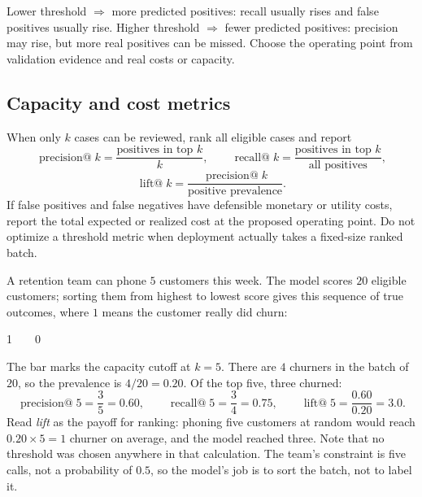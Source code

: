 \begin{keyidea}
Lower threshold $\Rightarrow$ more predicted positives: recall usually rises and false positives usually rise. Higher threshold $\Rightarrow$ fewer predicted positives: precision may rise, but more real positives can be missed. Choose the operating point from validation evidence and real costs or capacity.
\end{keyidea}

\subsection{Capacity and cost metrics}
\label{sec:capacity-metrics}

When only $k$ cases can be reviewed, rank all eligible cases and report
\[
\operatorname{precision@}k=\frac{\text{positives in top }k}{k},
\qquad
\operatorname{recall@}k=\frac{\text{positives in top }k}{\text{all positives}},
\]
\[
\operatorname{lift@}k=
\frac{\operatorname{precision@}k}{\text{positive prevalence}}.
\]
If false positives and false negatives have defensible monetary or utility costs, report the total expected or realized cost at the proposed operating point. Do not optimize a threshold metric when deployment actually takes a fixed-size ranked batch.

\begin{workedexample}
A retention team can phone $5$ customers this week. The model scores $20$ eligible customers; sorting them from highest to lowest score gives this sequence of true outcomes, where $1$ means the customer really did churn:
\begin{center}\ttfamily\small
1\ \ \vrule\ \ 0
\end{center}
The bar marks the capacity cutoff at $k=5$. There are $4$ churners in the batch of $20$, so the prevalence is $4/20=0.20$. Of the top five, three churned:
\[
  \operatorname{precision@}5=\frac{3}{5}=0.60,
  \qquad
  \operatorname{recall@}5=\frac{3}{4}=0.75,
  \qquad
  \operatorname{lift@}5=\frac{0.60}{0.20}=3.0.
\]
Read \emph{lift} as the payoff for ranking: phoning five customers at random would reach $0.20\times5=1$ churner on average, and the model reached three. Note that no threshold was chosen anywhere in that calculation. The team's constraint is five calls, not a probability of $0.5$, so the model's job is to sort the batch, not to label it.
\end{workedexample}

